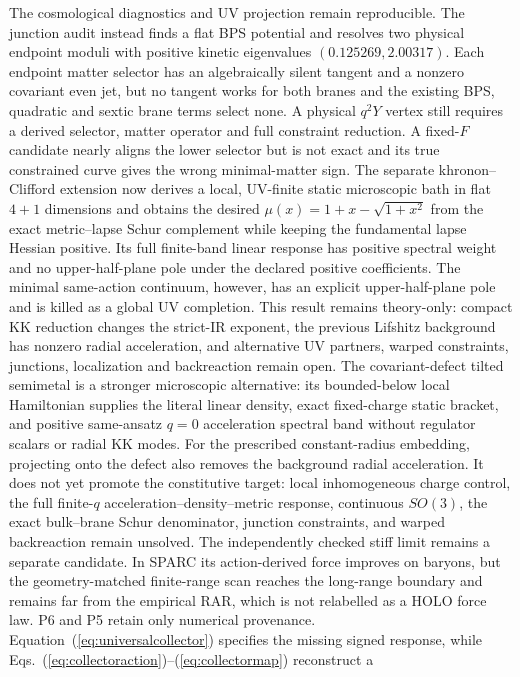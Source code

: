 \documentclass[10pt]{article}
\begin{document}
The cosmological diagnostics and UV projection remain reproducible.  The
junction audit instead finds a flat BPS potential and resolves two physical
endpoint moduli with positive kinetic eigenvalues $(0.125269,2.00317)$.  Each
endpoint matter selector has an algebraically silent tangent and a nonzero
covariant even jet, but no tangent works for both branes and the existing BPS,
quadratic and sextic brane terms select none.  A physical $q^2Y$ vertex still
requires a derived selector, matter operator and full constraint reduction.
A fixed-$F$ candidate nearly aligns the lower selector but is not exact and
its true constrained curve gives the wrong minimal-matter sign.
The separate khronon--Clifford extension now derives a local, UV-finite static
microscopic bath in flat $4+1$ dimensions and obtains the desired
$\mu(x)=1+x-\sqrt{1+x^2}$ from the exact metric--lapse Schur complement while
keeping the fundamental lapse Hessian positive.  Its full finite-band linear
response has positive spectral weight and no upper-half-plane pole under the
declared positive coefficients.  The minimal same-action continuum, however,
has an explicit upper-half-plane pole and is killed as a global UV completion.
This result remains theory-only: compact KK reduction changes the strict-IR
exponent, the previous Lifshitz background has nonzero radial acceleration,
and alternative UV partners, warped constraints, junctions, localization and
backreaction remain open.
The covariant-defect tilted semimetal is a stronger microscopic alternative:
its bounded-below local Hamiltonian supplies the literal linear density, exact
fixed-charge static bracket, and positive same-ansatz $q=0$ acceleration
spectral band
without regulator scalars or radial KK modes.  For the prescribed
constant-radius embedding, projecting onto the defect also removes the
background radial acceleration.  It does not yet promote the
constitutive target: local inhomogeneous charge control, the full finite-$q$
acceleration--density--metric response, continuous $SO(3)$, the exact
bulk--brane Schur denominator, junction constraints, and warped backreaction
remain unsolved.
The independently checked stiff limit remains a separate candidate.  In SPARC
its action-derived force improves on baryons,
but the geometry-matched finite-range scan reaches the long-range boundary and
remains far from the empirical RAR, which is not relabelled as a HOLO force
law.  P6 and P5 retain only numerical provenance.
Equation~(\ref{eq:universalcollector}) specifies the missing signed response,
while Eqs.~(\ref{eq:collectoraction})--(\ref{eq:collectormap}) reconstruct a
\end{document}
